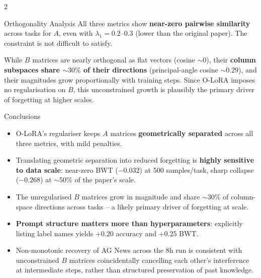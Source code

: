 \documentclass[portrait,a0,final]{a0poster}
\begin{document}
\begin{multicols}{2}
\begin{secbox}{Orthogonality Analysis}
All three metrics show \textbf{near-zero pairwise similarity} across tasks for $A$, even with
$\lambda_1 = 0.2\text{--}0.3$ (lower than the original paper). The constraint is not difficult
to satisfy.

While $B$ matrices are nearly orthogonal as flat vectors (cosine $\sim 0$), their
\textbf{column subspaces share $\sim 30\%$ of their directions} (principal-angle cosine
$\sim 0.29$), and their magnitudes grow proportionally with training steps. Since O-LoRA
imposes no regularisation on $B$, this unconstrained growth is plausibly the primary driver
of forgetting at higher scales.
\end{secbox}

\begin{secbox}{Conclusions}
\large
\begin{itemize}[leftmargin=1.2em,topsep=2pt,itemsep=2pt]
  \item O-LoRA's regulariser keeps $A$ matrices \textbf{geometrically separated} across all
        three metrics, with mild penalties.
  \item Translating geometric separation into reduced forgetting is \textbf{highly sensitive
        to data scale}: near-zero BWT ($-0.032$) at 500 samples/task, sharp collapse
        ($-0.268$) at $\sim$50\% of the paper's scale.
  \item The unregularised $B$ matrices grow in magnitude and share $\sim 30\%$ of column-space
        directions across tasks -- a likely primary driver of forgetting at scale.
  \item \textbf{Prompt structure matters more than hyperparameters}: explicitly listing label
        names yields $+0.20$ accuracy and $+0.25$ BWT.
  \item Non-monotonic recovery of AG News across the 8h run is consistent with unconstrained
        $B$ matrices coincidentally cancelling each other's interference at intermediate
        steps, rather than structured preservation of past knowledge.
\end{itemize}
\end{secbox}


\end{multicols}
\end{document}

